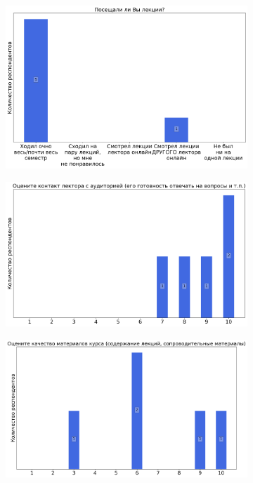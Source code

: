 		\begin{figure}[H]
			\centering
            \begin{subfigure}[b]{0.45\textwidth}
				\centering
				\includegraphics[width=\textwidth]{images/4 course/Квантовая механика/lecturer-questions-Иванов М.Г.-0.png}
			\end{subfigure}
			\begin{subfigure}[b]{0.45\textwidth}
				\centering
				\includegraphics[width=\textwidth]{images/4 course/Квантовая механика/lecturer-marks-Иванов М.Г.-0.png}
			\end{subfigure}
			\begin{subfigure}[b]{0.45\textwidth}
				\centering
				\includegraphics[width=\textwidth]{images/4 course/Квантовая механика/lecturer-marks-Иванов М.Г.-1.png}

\end{subfigure}
\end{figure}
